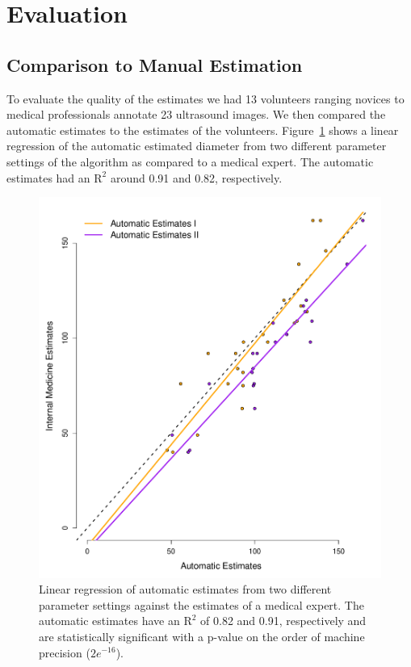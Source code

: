 \documentclass{llncs}
\begin{document}
\section{Evaluation}

\subsection{Comparison to Manual Estimation}
To evaluate the quality of the estimates we had 13 volunteers ranging novices to
medical professionals annotate 23 ultrasound images. We then compared the
automatic estimates to the estimates of the volunteers.
Figure~\ref{fig:regression} shows a linear regression of the automatic estimated
diameter from two different parameter settings of the algorithm as compared to a
medical expert. The automatic estimates had an $\textrm{R}^2$ around 0.91 and
0.82, respectively. 
\begin{figure}
\centering
\includegraphics[width=0.65\linewidth]{linear-fit.pdf} 
\caption{
\label{fig:regression}
Linear regression of automatic estimates from two different parameter settings
against the estimates of a medical expert. The automatic estimates have an
$\mathrm{R}^2$
of 0.82 and 0.91, respectively and are statistically significant with a p-value
on the order of machine precision ($2e^{-16}$).
}
\end{figure}
\end{document}
